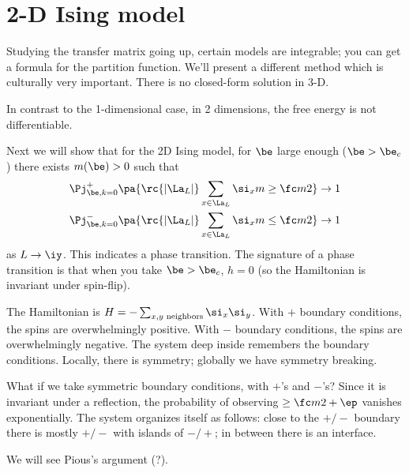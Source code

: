 \section{2-D Ising model}

Studying the transfer matrix going up, certain models are integrable; you can get a formula for the partition function. We'll present a different method which is culturally very important.
There is no closed-form solution in 3-D.

In contrast to the 1-dimensional case, in 2 dimensions, the free energy is not differentiable. 

Next we will show that for the 2D Ising model, for $\be$ large enough ($\be>\be_c$) there exists $m(\be)>0$ such that 
\begin{align}
\Pj_{\be,k=0}^+\pa{\rc{|\La_L|}\sum_{x\in \La_L} \si_x m\ge\fc m2}&\to 1\\
\Pj_{\be,k=0}^-\pa{\rc{|\La_L|}\sum_{x\in \La_L} \si_x m\le \fc m2}&\to 1
\end{align}
as $L\to \iy$. This indicates a phase transition. 
The signature of a phase transition is that when you take $\be>\be_c$, $h=0$ (so the Hamiltonian is invariant under spin-flip).

The Hamiltonian is $H=-\sum_{x,y\text{ neighbors}} \si_x\si_y$.
With $+$ boundary conditions, the spins are overwhelmingly positive. With $-$ boundary conditions, the spins are overwhelmingly negative. The system deep inside remembers the boundary conditions. 
Locally, there is symmetry; globally we have symmetry breaking.

What if we take symmetric boundary conditions, with $+$'s and $-$'s? Since it is invariant under a reflection, the probability of observing $\ge \fc m2+\ep$ vanishes exponentially. The system organizes itself as follows: close to the $+/-$ boundary there is mostly $+/-$ with islands of $-/+$; in between there is an interface.


We will see Pious's argument (?).
